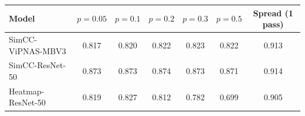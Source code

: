 \begin{tabular}{lcccccc}
\toprule
Model & $p{=}0.05$ & $p{=}0.1$ & $p{=}0.2$ & $p{=}0.3$ & $p{=}0.5$ & Spread (1 pass) \\
\midrule
SimCC-ViPNAS-MBV3 & 0.817 & 0.820 & 0.822 & 0.823 & 0.822 & 0.913 \\
SimCC-ResNet-50 & 0.873 & 0.873 & 0.874 & 0.873 & 0.871 & 0.914 \\
Heatmap-ResNet-50 & 0.819 & 0.827 & 0.812 & 0.782 & 0.699 & 0.905 \\
\bottomrule
\end{tabular}
